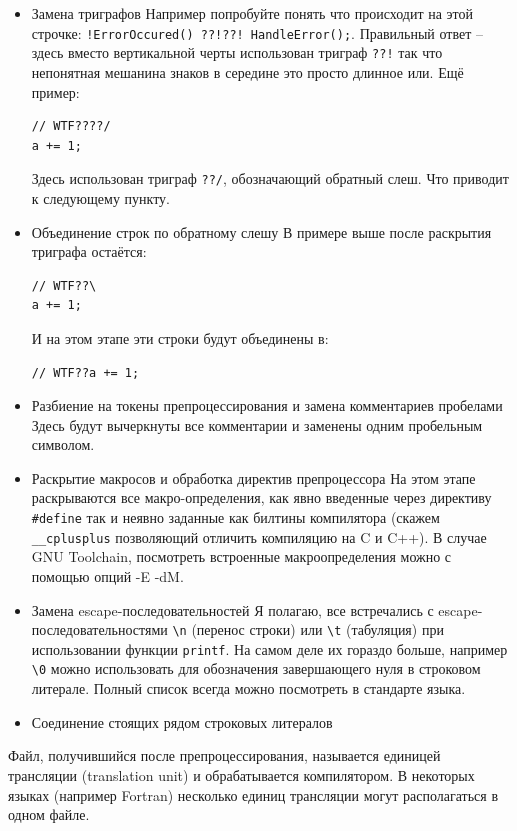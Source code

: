 \documentclass[a4paper,12pt,oneside]{article}
\begin{document}
\begin{itemize}
\item Замена триграфов 
Например попробуйте понять что происходит на этой строчке: \lstinline$!ErrorOccured() ??!??! HandleError();$. Правильный ответ -- здесь вместо вертикальной черты использован триграф \lstinline$??!$ так что непонятная мешанина знаков в середине это просто длинное или. Ещё пример: 

\begin{lstlisting}
// WTF????/
a += 1;
\end{lstlisting}

Здесь использован триграф \lstinline$??/$, обозначающий обратный слеш. Что приводит к следующему пункту.
\item Объединение строк по обратному слешу
В примере выше после раскрытия триграфа остаётся:
\begin{lstlisting}
// WTF??\
a += 1;
\end{lstlisting}
И на этом этапе эти строки будут объединены в:
\begin{lstlisting}
// WTF??a += 1;
\end{lstlisting}
\item Разбиение на токены препроцессирования и замена комментариев пробелами
Здесь будут вычеркнуты все комментарии и заменены одним пробельным символом.
\item Раскрытие макросов и обработка директив препроцессора
На этом этапе раскрываются все макро-определения, как явно введенные через директиву \lstinline!#define! так и неявно заданные как билтины компилятора (скажем \lstinline!__cplusplus! позволяющий отличить компиляцию на C и C++). В случае GNU Toolchain, посмотреть встроенные макроопределения можно с помощью опций -E -dM.
\item Замена escape-последовательностей
Я полагаю, все встречались с escape-последовательностями \lstinline!\n! (перенос строки) или \lstinline!\t! (табуляция) при использовании функции \lstinline!printf!. На самом деле их гораздо больше, например \lstinline!\0! можно использовать для обозначения завершающего нуля в строковом литерале. Полный список всегда можно посмотреть в стандарте языка.
\item Соединение стоящих рядом строковых литералов
\end{itemize}

Файл, получившийся после препроцессирования, называется единицей трансляции (translation unit) и обрабатывается компилятором. В некоторых языках (например Fortran) несколько единиц трансляции могут располагаться в одном файле.
\end{document}

